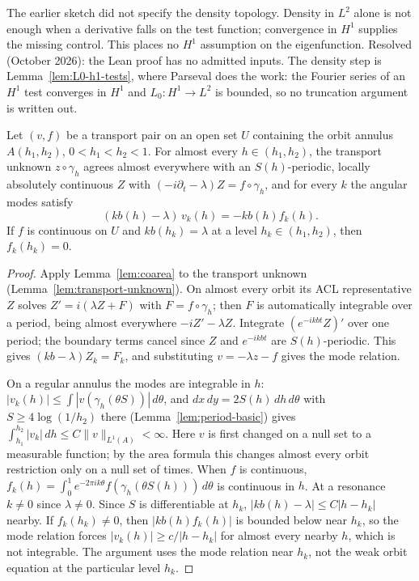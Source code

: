 \begin{remark}
The earlier sketch did not specify the density topology. Density in
$L^2$ alone is not enough when a derivative falls on the test function;
convergence in $H^1$ supplies the missing control. This places no $H^1$
assumption on the eigenfunction.
Resolved (October 2026): the Lean proof has no admitted inputs. The density step is
Lemma~\ref{lem:L0-h1-tests}, where Parseval does the work: the Fourier series of an $H^1$
test converges in $H^1$ and $L_0:H^1\to L^2$ is bounded, so no truncation argument is
written out.
\end{remark}

\begin{lemma}
\label{lem:resonant-vanishing}
\leanok
Let $(v,f)$ be a transport pair on an open set $U$ containing the orbit annulus
$A(h_1,h_2)$, $0<h_1<h_2<1$. For almost every $h\in(h_1,h_2)$, the transport unknown
$z\circ\gamma_h$ agrees almost everywhere with an $S(h)$-periodic, locally absolutely
continuous $Z$ with $(-i\partial_t-\lambda)Z=f\circ\gamma_h$, and for every $k$ the angular
modes satisfy
\[
  (kb(h)-\lambda)\,v_k(h)=-kb(h)f_k(h).
\]
If $f$ is continuous on $U$ and $kb(h_k)=\lambda$ at a level $h_k\in(h_1,h_2)$, then
$f_k(h_k)=0$.
\end{lemma}

\begin{proof}
\leanok
Apply Lemma~\ref{lem:coarea} to the transport unknown
(Lemma~\ref{lem:transport-unknown}). On almost every orbit its ACL
representative $Z$ solves $Z'=i(\lambda Z+F)$ with $F=f\circ\gamma_h$; then $F$ is
automatically integrable over a period, being almost everywhere $-iZ'-\lambda Z$.
Integrate $(e^{-ikbt}Z)'$ over one period; the boundary terms cancel since $Z$ and
$e^{-ikbt}$ are $S(h)$-periodic. This gives $(kb-\lambda)Z_k=F_k$, and substituting
$v=-\lambda z-f$ gives the mode relation.

On a regular annulus the modes are integrable in $h$: $|v_k(h)|\le\int|v(\gamma_h(\theta S))|\,d\theta$,
and $dx\,dy=2S(h)\,dh\,d\theta$ with $S\ge4\log(1/h_2)$ there (Lemma~\ref{lem:period-basic})
gives $\int_{h_1}^{h_2}|v_k|\,dh\le C\|v\|_{L^1(A)}<\infty$. Here $v$ is first changed on a
null set to a measurable function; by the area formula this changes almost every orbit
restriction only on a null set of times.
When $f$ is continuous, $f_k(h)=\int_0^1e^{-2\pi ik\theta}f(\gamma_h(\theta S(h)))\,d\theta$
is continuous in $h$. At a resonance $k\ne0$ since $\lambda\ne0$. Since $S$ is
differentiable at $h_k$, $|kb(h)-\lambda|\le C|h-h_k|$ nearby. If $f_k(h_k)\ne0$, then
$|kb(h)f_k(h)|$ is bounded below near $h_k$, so the mode relation forces
$|v_k(h)|\ge c/|h-h_k|$ for almost every nearby $h$, which is not integrable.
The argument uses the mode relation near $h_k$, not the weak orbit equation at the
particular level $h_k$.
\end{proof}

